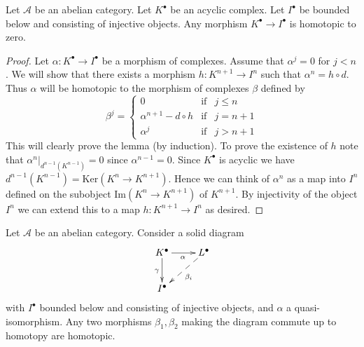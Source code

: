 \begin{lemma}
\label{lemma-acyclic-is-zero}
Let $\mathcal{A}$ be an abelian category.
Let $K^\bullet$ be an acyclic complex.
Let $I^\bullet$ be bounded below and consisting of injective objects.
Any morphism $K^\bullet \to I^\bullet$ is homotopic to zero.
\end{lemma}

\begin{proof}
Let $\alpha : K^\bullet \to I^\bullet$ be a morphism of
complexes. Assume that $\alpha^j = 0$ for $j < n$.
We will show that there exists a morphism $h : K^{n + 1} \to I^n$
such that $\alpha^n = h \circ d$. Thus $\alpha$ will be homotopic
to the morphism of complexes $\beta$ defined by
$$
\beta^j =
\left\{
\begin{matrix}
0 & \text{if} & j \leq n \\
\alpha^{n + 1} - d \circ h & \text{if} & j = n + 1 \\
\alpha^j & \text{if} & j > n + 1
\end{matrix}
\right.
$$
This will clearly prove the lemma (by induction).
To prove the existence of $h$ note that
$\alpha^n|_{d^{n - 1}(K^{n - 1})} = 0$ since
$\alpha^{n - 1} = 0$. Since $K^\bullet$ is acyclic we
have $d^{n - 1}(K^{n - 1}) = \text{Ker}(K^n \to K^{n + 1})$.
Hence we can think of $\alpha^n$ as a map into $I^n$ defined
on the subobject $\text{Im}(K^n \to K^{n + 1})$ of $K^{n + 1}$.
By injectivity of the object $I^n$ we can extend this to
a map $h : K^{n + 1} \to I^n$ as desired.
\end{proof}

\begin{lemma}
\label{lemma-morphisms-equal-up-to-homotopy}
Let $\mathcal{A}$ be an abelian category.
Consider a solid diagram
$$
\xymatrix{
K^\bullet \ar[r]_\alpha \ar[d]_\gamma & L^\bullet \ar@{-->}[dl]^{\beta_i} \\
I^\bullet
}
$$
with $I^\bullet$ bounded below and consisting of injective
objects, and $\alpha$ a quasi-isomorphism.
Any two morphisms $\beta_1, \beta_2$ making the diagram commute
up to homotopy are homotopic.
\end{lemma}

